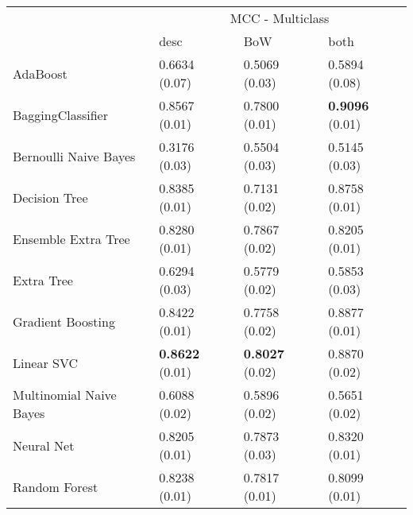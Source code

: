 \begin{tabular}{|l|l|l|l| }
\hline
 &  \multicolumn{3}{c|}{ MCC - Multiclass} \\
\cline{2-4} & desc & BoW & both \\ \hline
AdaBoost                & 0.6634 (0.07) & 0.5069 (0.03) & 0.5894 (0.08)\\
BaggingClassifier       & 0.8567 (0.01) & 0.7800 (0.01) & {\bf 0.9096} (0.01)\\
Bernoulli Naive Bayes   & 0.3176 (0.03) & 0.5504 (0.03) & 0.5145 (0.03)\\
Decision Tree           & 0.8385 (0.01) & 0.7131 (0.02) & 0.8758 (0.01)\\
Ensemble Extra Tree     & 0.8280 (0.01) & 0.7867 (0.02) & 0.8205 (0.01)\\
Extra Tree              & 0.6294 (0.03) & 0.5779 (0.02) & 0.5853 (0.03)\\
Gradient Boosting       & 0.8422 (0.01) & 0.7758 (0.02) & 0.8877 (0.01)\\
Linear SVC              & {\bf 0.8622} (0.01) & {\bf 0.8027} (0.02) & 0.8870 (0.02)\\
Multinomial Naive Bayes & 0.6088 (0.02) & 0.5896 (0.02) & 0.5651 (0.02)\\
Neural Net              & 0.8205 (0.01) & 0.7873 (0.03) & 0.8320 (0.01)\\
Random Forest           & 0.8238 (0.01) & 0.7817 (0.01) & 0.8099 (0.01)\\
\hline
\end{tabular}